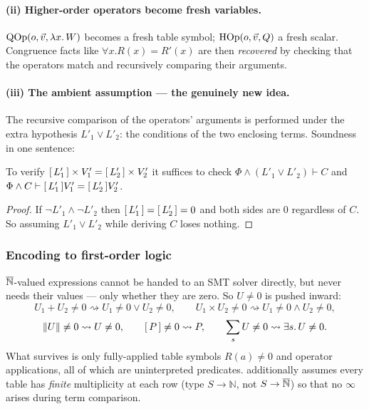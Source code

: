 \paragraph{(ii) Higher-order operators become fresh variables.}
$\mathrm{QOp}(o,\vec v,\lambda x.\,W)$ becomes a fresh table symbol; $\mathrm{HOp}(o,\vec v,Q)$ a fresh scalar.
Congruence facts like $\forall x.R(x)=R'(x)$ are then \emph{recovered} by checking that the
operators match and recursively comparing their arguments.

\paragraph{(iii) The ambient assumption --- the genuinely new idea.}
\label{sec:ambient}
The recursive comparison of the operators' arguments is performed under the extra hypothesis
$L'_1\vee L'_2$: the conditions of the two enclosing terms. Soundness in one sentence:

\begin{lemma}
To verify $[\,L'_1\,]\times V'_1=[\,L'_2\,]\times V'_2$ it suffices to check
$\Phi\wedge(L'_1\vee L'_2)\vdash C$ and $\Phi\wedge C\vdash [\,L'_1\,]V'_1=[\,L'_2\,]V'_2$.
\end{lemma}
\begin{proof}
If $\neg L'_1\wedge\neg L'_2$ then $[\,L'_1\,]=[\,L'_2\,]=0$ and both sides are $0$
regardless of $C$. So assuming $L'_1\vee L'_2$ while deriving $C$ loses nothing.
\end{proof}

\subsubsection{Encoding to first-order logic}
$\overline{\mathbb{N}}$-valued expressions cannot be handed to an SMT solver directly, but \QED{} never
needs their values --- only whether they are zero. So $U\neq0$ is pushed inward:
\[
U_1+U_2\neq0 \rightsquigarrow U_1\neq0\vee U_2\neq0,\qquad
U_1\times U_2\neq0 \rightsquigarrow U_1\neq0\wedge U_2\neq0,
\]
\[
\left\lVert U \right\rVert\neq0\rightsquigarrow U\neq0,\qquad
[\,P\,]\neq0\rightsquigarrow P,\qquad
\sum_{s}U\neq0\rightsquigarrow \exists s.\,U\neq0.
\]
What survives is only fully-applied table symbols $R(a)\neq0$ and operator applications, all
of which are uninterpreted predicates. \QED{} additionally assumes every table has
\emph{finite} multiplicity at each row (type $S\to\mathbb{N}$, not $S\to\overline{\mathbb{N}}$) so that no
$\infty$ arises during term comparison.



